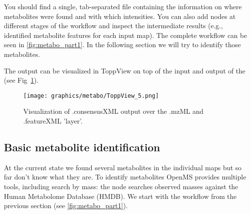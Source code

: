 You should find a single, tab-separated file containing the information on where metabolites were found and with which intensities.
You can also add  nodes at different stages of the workflow and inspect the intermediate results (e.g., identified metabolite features for each input map).
The complete workflow can be seen in \cref{fig:metabo_part1}.
In the following section we will try to identify those metabolites.

\noindent The  output can be visualized in ToppView on top of the input and output of the  (see Fig~\ref{fig:ToppView_5}). 

\begin{figure}[htbp]
  \centering
  \texttt{[image: graphics/metabo/ToppView\_5.png]}
  \caption{Visualization of .consensusXML output over the .mzML and .featureXML 'layer'. }
  \label{fig:ToppView_5}
\end{figure}

\subsection{Basic metabolite identification}

At the current state we found several metabolites in the individual maps but so far don't know what they are.
To identify metabolites OpenMS provides multiple tools, including search by mass: the  node searches observed masses against the Human Metabolome Database (HMDB)\cite{Wishart2007,Wishart2009,Wishart2013}.
We start with the workflow from the previous section (see \cref{fig:metabo_part1}).

